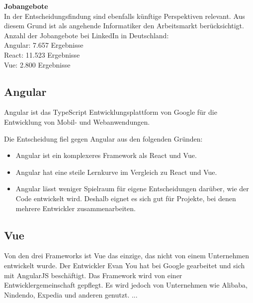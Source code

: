 \textbf{Jobangebote}\\
In der Entscheidungsfindung sind ebenfalls künftige Perspektiven relevant.
Aus diesem Grund ist als angehende Informatiker den Arbeitsmarkt berücksichtigt.    
\\
Anzahl der Jobangebote bei LinkedIn in Deutschland:
\\
Angular: 7.657 Ergebnisse{\cite{LI3}}
\\
React: 11.523 Ergebnisse{\cite{LI2}}
\\
Vue: 2.800 Ergebnisse{\cite{LI1}}



\subsection{Angular}
Angular ist das TypeScript Entwicklungsplattform von Google für die Entwicklung von
 Mobil- und Webanwendungen.

Die Entscheidung fiel gegen Angular aus den folgenden Gründen:
\begin{itemize}
  \item
        Angular ist ein komplexeres Framework als React und Vue.
  \item
        Angular hat eine steile Lernkurve im Vergleich zu React und Vue.{\cite{E01}}
  \item
        Angular lässt weniger Spielraum für eigene Entscheidungen darüber, wie der Code entwickelt wird. Deshalb eignet es sich gut für Projekte, bei denen mehrere Entwickler zusammenarbeiten.
\end{itemize}

\subsection{Vue}
Von den drei Frameworks ist Vue das einzige, das nicht von einem Unternehmen entwickelt wurde. Der Entwickler Evan You hat bei Google gearbeitet und sich mit AngularJS beschäftigt. Das Framework wird von einer Entwicklergemeinschaft gepflegt. Es wird jedoch von Unternehmen wie Alibaba, Nindendo, Expedia und anderen genutzt.
...



{\cite{V02}}

